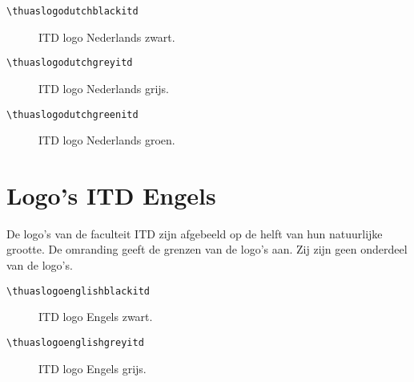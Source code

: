 \documentclass[a4paper,12pt]{article}
\begin{document}
\begin{verbatim}
\thuaslogodutchblackitd
\end{verbatim}

\begin{figure}[H]
\centering\fboxsep=0pt%
\fbox{%
\scalebox{0.7071}{\thuaslogodutchblackitd}}
\caption{ITD logo Nederlands zwart.}
\end{figure}

\begin{verbatim}
\thuaslogodutchgreyitd
\end{verbatim}

\begin{figure}[H]
\centering\fboxsep=0pt%
\fbox{%
\scalebox{0.7071}{\thuaslogodutchgreyitd}}
\caption{ITD logo Nederlands grijs.}
\end{figure}

\begin{verbatim}
\thuaslogodutchgreenitd
\end{verbatim}

\begin{figure}[H]
\centering\fboxsep=0pt%
\fbox{%
\scalebox{0.7071}{\thuaslogodutchgreenitd}}
\caption{ITD logo Nederlands groen.}
\end{figure}


\section{Logo's ITD Engels}
De logo's van de faculteit ITD zijn afgebeeld op de helft van hun natuurlijke grootte.
De omranding geeft de grenzen van de logo's aan. Zij zijn geen onderdeel
van de logo's.

\begin{verbatim}
\thuaslogoenglishblackitd
\end{verbatim}

\begin{figure}[H]
\centering\fboxsep=0pt%
\fbox{%
\scalebox{0.7071}{\thuaslogoenglishblackitd}}
\caption{ITD logo Engels zwart.}
\end{figure}

\begin{verbatim}
\thuaslogoenglishgreyitd
\end{verbatim}

\begin{figure}[H]
\centering\fboxsep=0pt%
\fbox{%
\scalebox{0.7071}{\thuaslogoenglishgreyitd}}
\caption{ITD logo Engels grijs.}
\end{figure}
\end{document}
